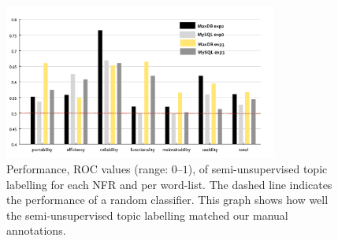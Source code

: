 \documentclass[smallextended]{svjour3}       %
\begin{document}


\begin{figure}[t]
  \centering
 \includegraphics[width=0.8\textwidth]{figures/unsupervised-bar}
 \caption{Performance, ROC values (range: $0$--$1$), of semi-unsupervised topic labelling for
   each NFR and per word-list. The dashed line indicates the performance of a random classifier. This graph shows how well the
   semi-unsupervised topic labelling matched our manual annotations.}

  \label{fig:maxdb-unsup-results}
\end{figure}

\end{document}
